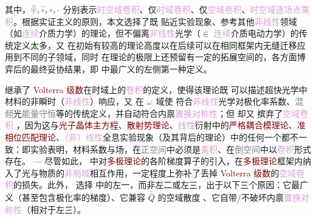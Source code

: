其中，$\mathcolor{gray}{\widetilde \circledast}, \mathcolor{gray}{\widetilde *}, \mathcolor{gray}{*}, \cdot$ 分别表示\textcolor{Plum}{时空域卷积}、仅\textcolor{Plum}{时域卷积}、仅\textcolor{Plum}{空域卷积}、\textcolor{Plum}{时空域逐场点乘积}。根据\textcolor{NavyBlue}{实证主义}的原则，本文选择了既 {\one} 贴近\textcolor{NavyBlue}{实验现象}、参考其他\textcolor{Plum}{非线性}领域（如\textcolor{Plum}{连续}介质\textcolor{NavyBlue}{力学}）的理论，但不偏离\textcolor{Plum}{非线性}\textcolor{NavyBlue}{光学}（$\in$ \textcolor{Plum}{连续}介质\textcolor{NavyBlue}{电动力学}）的传统定义太多，又 {\two} 在初始有较高的理论高度以在后续可以在相同框架内无缝迁移应用到不同的子领域，同时 {\three} 在理论的极限上还预留有一定的拓展空间的，各方面博弈后的最终妥协结果，即  中最广义的左侧第一种定义。

 继承了 \textcolor{Maroon}{Volterra 级数}在时域上的\textcolor{Plum}{卷积}的定义，使得该理论既 {\one} 可以描述超快光学中材料的\textcolor{NavyBlue}{非瞬时}（\textcolor{Plum}{非线性}）响应，又 {\two} 在 $\mathcolor{gray}{\omega}$ 域使  符合\textcolor{Plum}{非线性}\textcolor{NavyBlue}{光学}对极化率系数、\textcolor{gray}{混频}光\textcolor{gray}{能量守恒}等的传统定义，并自动符合内禀\textcolor{Plum}{置换对称性}；但  却又 {\three} 摈弃了\textcolor{Plum}{空域卷积} ，因为这与\textcolor{Maroon}{光子晶体主方程}\cite{sakodaOpticalPropertiesPhotonic2005,joannopoulosPhotonicCrystalsMolding2008}、\textcolor{Maroon}{散射势理论}\cite{PrinciplesOptics7th,gerkeAperiodicVolumeOptics2010}、\textcolor{Plum}{线性}衍射中的\textcolor{Maroon}{严格耦合模理论}\cite{moharamRigorousCoupledwaveAnalysis1981,ZhuBangTaoGeXiangYiXingZhouQiXingJieGourcwaSuanFaJiBingXingJiSuanJiaSu2016}、\textcolor{Maroon}{准相位匹配理论}\cite{arieQuasiPhaseMatching2007a,zhangUniversalModelingSecondorder2018,chenQuasiphasematchingdivisionMultiplexingHolography2021b,chenLaserNanoprinting3D2023}、\textcolor{Plum}{（非）线性}全息实验现象（及其背后的理论）\cite{zhangNonlinearPhotonicCrystals2021,chenQuasiphasematchingdivisionMultiplexingHolography2021b,chenLaserNanoprinting3D2023,gerkeAperiodicVolumeOptics2010}中的任何一个都不一致：即实验表明，材料系数与场，在\textcolor{gray}{正空间}中必须是\textcolor{Plum}{乘积}、在\textcolor{gray}{倒空间}中以\textcolor{Plum}{卷积}形式存在。 ---  尽管如此，{\four}  中对\textcolor{Maroon}{多极理论}的各阶梯度算子的引入，在\textcolor{Maroon}{多极理论}框架内纳入了光与物质的\textcolor{Plum}{非局域}相互作用，一定程度上弥补了丢掉 \textcolor{Maroon}{Volterra 级数}的\textcolor{Plum}{空域卷积}的损失。此外，{\five} 选择  中的左一，而非左二或左三，出于以下三个原因：它最广义（甚至包含极化率的梯度）、它兼容 $\bar{\bar{Q}}$ 的空域散度 、它自带/不破坏内禀\textcolor{Plum}{置换对称性}（相对于左三）。

